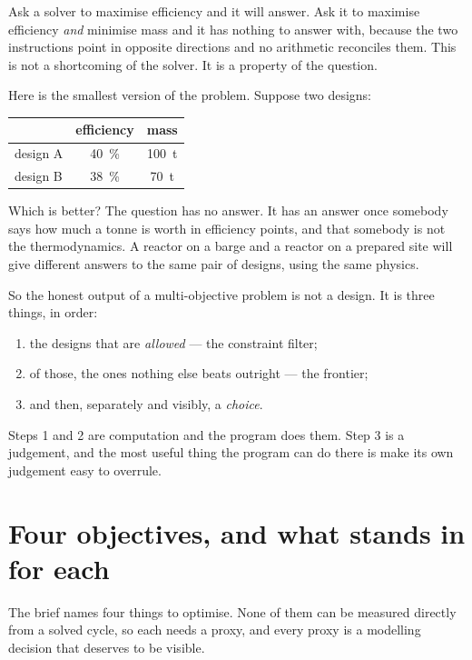 \documentclass[11pt,a4paper]{report}
\begin{document}
Ask a solver to maximise efficiency and it will answer. Ask it to maximise
efficiency \emph{and} minimise mass and it has nothing to answer with,
because the two instructions point in opposite directions and no arithmetic
reconciles them. This is not a shortcoming of the solver. It is a property
of the question.

Here is the smallest version of the problem. Suppose two designs:

\begin{center}
\begin{tabular}{lcc}
\toprule
 & efficiency & mass \\
\midrule
design A & \SI{40}{\percent} & \SI{100}{\tonne} \\
design B & \SI{38}{\percent} & \SI{70}{\tonne} \\
\bottomrule
\end{tabular}
\end{center}

Which is better? The question has no answer. It has an answer once somebody
says how much a tonne is worth in efficiency points, and that somebody is
not the thermodynamics. A reactor on a barge and a reactor on a prepared
site will give different answers to the same pair of designs, using the same
physics.

So the honest output of a multi-objective problem is not a design. It is
three things, in order:

\begin{enumerate}\itemsep2pt
\item the designs that are \emph{allowed} --- the constraint filter;
\item of those, the ones nothing else beats outright --- the frontier;
\item and then, separately and visibly, a \emph{choice}.
\end{enumerate}

Steps 1 and 2 are computation and the program does them. Step 3 is a
judgement, and the most useful thing the program can do there is make its
own judgement easy to overrule.

\section{Four objectives, and what stands in for each}

The brief names four things to optimise. None of them can be measured
directly from a solved cycle, so each needs a proxy, and every proxy is a
modelling decision that deserves to be visible.
\end{document}
